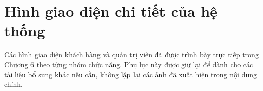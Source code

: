
\section{Hình giao diện chi tiết của hệ thống}
\label{frontend-screens}

Các hình giao diện khách hàng và quản trị viên đã được trình bày trực tiếp trong
Chương 6 theo từng nhóm chức năng. Phụ lục này được giữ lại để dành cho các tài
liệu bổ sung khác nếu cần, không lặp lại các ảnh đã xuất hiện trong nội dung chính.
